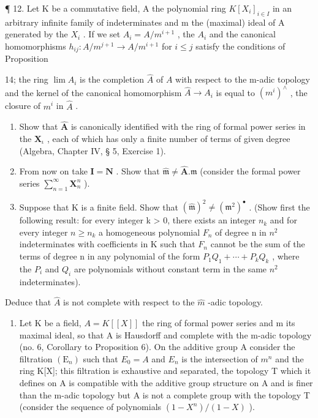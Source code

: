  ¶ 12. Let K be a commutative field, A the polynomial ring \(K[X_{i}]_{i\in I}\) in an arbitrary infinite family of indeterminates and m the (maximal) ideal of A generated by the \(X_{i}\) . If we set \(A_{i}=A/m^{i+1}\) , the \(A_{i}\) and the canonical homomorphisms \(h_{ij}:A/m^{j+1}\to A/m^{i+1}\) for \(i\leqslant j\) satisfy the conditions of Proposition

14; the ring \(\lim A_{i}\) is the completion \(\hat{A}\) of \(A\) with respect to the m-adic topology and the kernel of the canonical homomorphism \(\hat{A} \to A_{i}\) is equal to \((m^{i})^{\wedge}\) , the closure of \(m^{i}\) in \(\hat{A}\) .

\begin{enumerate}
\def\labelenumi{(\alph{enumi})}
\item
  Show that \(\hat{\mathbf{A}}\) is canonically identified with the ring of formal power series in the \(\mathbf{X}_{\iota}\) , each of which has only a finite number of terms of given degree (Algebra, Chapter IV, § 5, Exercise 1).
\item
  From now on take \(\mathbf{I} = \mathbf{N}\) . Show that \(\hat{\mathfrak{m}} \neq \hat{\mathbf{A}}. \mathfrak{m}\) (consider the formal power series \(\sum_{n=1}^{\infty} \mathbf{X}_n^n\) ).
\item
  Suppose that K is a finite field. Show that \((\hat{\mathfrak{m}})^{2} \neq (\mathfrak{m}^{2})^{\bullet}\) . (Show first the following result: for every integer k \textgreater{} 0, there exists an integer \(n_{k}\) and for every integer \(n \geqslant n_{k}\) a homogeneous polynomial \(F_{n}\) of degree n in \(n^{2}\) indeterminates with coefficients in K such that \(F_{n}\) cannot be the sum of the terms of degree n in any polynomial of the form \(P_{1}Q_{1} + \cdots + P_{k}Q_{k}\) , where the \(P_{i}\) and \(Q_{i}\) are polynomials without constant term in the same \(n^{2}\) indeterminates).
\end{enumerate}

Deduce that \(\hat{A}\) is not complete with respect to the \(\hat{m}\) -adic topology.

\begin{enumerate}
\def\labelenumi{\arabic{enumi}.}
\setcounter{enumi}{12}
\tightlist
\item
  Let K be a field, \(A = K[[X]]\) the ring of formal power series and m its maximal ideal, so that A is Hausdorff and complete with the m-adic topology (no. 6, Corollary to Proposition 6). On the additive group A consider the filtration \((\mathrm{E}_{n})\) such that \(E_{0} = A\) and \(E_{n}\) is the intersection of \(m^{n}\) and the ring K{[}X{]}; this filtration is exhaustive and separated, the topology T which it defines on A is compatible with the additive group structure on A and is finer than the m-adic topology but A is not a complete group with the topology T (consider the sequence of polynomials \((1 - X^{n})/(1 - X)\) ).
\end{enumerate}


